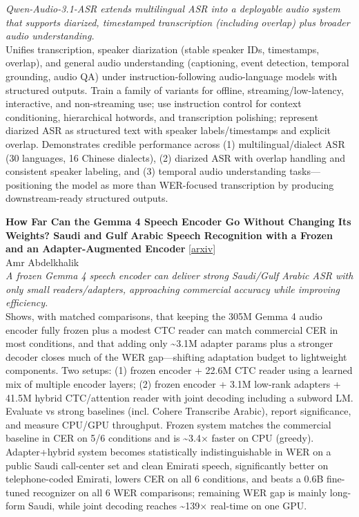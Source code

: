 \documentclass[12pt,letterpaper]{article}
\begin{document}
{\small\textit{Qwen-Audio-3.1-ASR extends multilingual ASR into a deployable audio system that supports diarized, timestamped transcription (including overlap) plus broader audio understanding.}}\\[1pt]
{\footnotesize Unifies transcription, speaker diarization (stable speaker IDs, timestamps, overlap), and general audio understanding (captioning, event detection, temporal grounding, audio QA) under instruction-following audio-language models with structured outputs. Train a family of variants for offline, streaming/low-latency, interactive, and non-streaming use; use instruction control for context conditioning, hierarchical hotwords, and transcription polishing; represent diarized ASR as structured text with speaker labels/timestamps and explicit overlap. Demonstrates credible performance across (1) multilingual/dialect ASR (30 languages, 16 Chinese dialects), (2) diarized ASR with overlap handling and consistent speaker labeling, and (3) temporal audio understanding tasks---positioning the model as more than WER-focused transcription by producing downstream-ready structured outputs.}

\medskip

{\small\textbf{How Far Can the Gemma 4 Speech Encoder Go Without Changing Its Weights? Saudi and Gulf Arabic Speech Recognition with a Frozen and an Adapter-Augmented Encoder}} {\scriptsize[\href{https://arxiv.org/abs/2610.28673}{arxiv}]}\\
{\scriptsize Amr Abdelkhalik}\\

{\small\textit{A frozen Gemma 4 speech encoder can deliver strong Saudi/Gulf Arabic ASR with only small readers/adapters, approaching commercial accuracy while improving efficiency.}}\\[1pt]
{\footnotesize Shows, with matched comparisons, that keeping the 305M Gemma 4 audio encoder fully frozen plus a modest CTC reader can match commercial CER in most conditions, and that adding only \textasciitilde{}3.1M adapter params plus a stronger decoder closes much of the WER gap---shifting adaptation budget to lightweight components. Two setups: (1) frozen encoder + 22.6M CTC reader using a learned mix of multiple encoder layers; (2) frozen encoder + 3.1M low-rank adapters + 41.5M hybrid CTC/attention reader with joint decoding including a subword LM. Evaluate vs strong baselines (incl. Cohere Transcribe Arabic), report significance, and measure CPU/GPU throughput. Frozen system matches the commercial baseline in CER on 5/6 conditions and is \textasciitilde{}3.4× faster on CPU (greedy). Adapter+hybrid system becomes statistically indistinguishable in WER on a public Saudi call-center set and clean Emirati speech, significantly better on telephone-coded Emirati, lowers CER on all 6 conditions, and beats a 0.6B fine-tuned recognizer on all 6 WER comparisons; remaining WER gap is mainly long-form Saudi, while joint decoding reaches \textasciitilde{}139× real-time on one GPU.}
\end{document}
